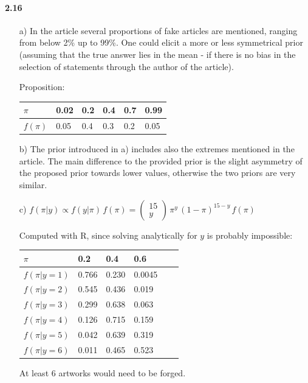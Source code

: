 \documentclass[fontsize=11pt,DIV=18,parskip=half]{scrartcl}
\begin{document}
\paragraph{2.16}
\begin{enumerate}
\item[a)] In the article several proportions of fake articles are mentioned, ranging from below 2\% up to 99\%. 
One could elicit a more or less symmetrical prior (assuming that the true answer lies in the mean - if there is no bias in the selection of statements through the author of the article).

Proposition:

\begin{tabular}{llllll}
\hline
$\pi$ & 0.02 & 0.2 & 0.4 & 0.7 & 0.99 \\
\hline
$f(\pi)$ & 0.05 & 0.4 & 0.3 & 0.2 & 0.05 \\
\hline
\end{tabular}

\item[b)] The prior introduced in a) includes also the extremes mentioned in the article. The main difference to the provided prior is the slight asymmetry of the proposed prior towards lower values, otherwise the two priors are very similar.

\item[c)] $f(\pi|y) \propto f(y|\pi)\, f(\pi) = \begin{pmatrix} 15 \\ y \end{pmatrix} \, \pi^{y} \, (1-\pi)^{15-y} \, f(\pi)$

Computed with R, since solving analytically for $y$ is probably impossible:

\begin{tabular}{llllll}
\hline
$\pi$ & 0.2 & 0.4 & 0.6 \\
\hline
$f(\pi|y=1)$ & 0.766 & 0.230 & 0.0045 \\
$f(\pi|y=2)$ & 0.545 & 0.436 & 0.019 \\
$f(\pi|y=3)$ & 0.299 & 0.638 & 0.063 \\
$f(\pi|y=4)$ & 0.126 & 0.715 & 0.159 \\
$f(\pi|y=5)$ & 0.042 & 0.639 & 0.319 \\
$f(\pi|y=6)$ & 0.011 & 0.465 & 0.523 \\
\hline
\end{tabular}

At least 6 artworks would need to be forged.
\end{enumerate}
\end{document}

